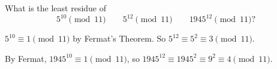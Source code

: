  What is the least residue of
\begin{equation*}
  5^{10}\pmod{11} \qquad 5^{12}\pmod{11} \qquad 1945^{12}\pmod{11}?
\end{equation*}
\begin{solution}
  $5^{10}\equiv1\pmod{11}$ by Fermat's Theorem. So
  $5^{12} \equiv 5^2 \equiv 3\pmod{11}$.

  By Fermat, $1945^{10}\equiv1\pmod{11}$, so
  $1945^{12}\equiv1945^2\equiv9^2\equiv4\pmod{11}$.
\end{solution}
